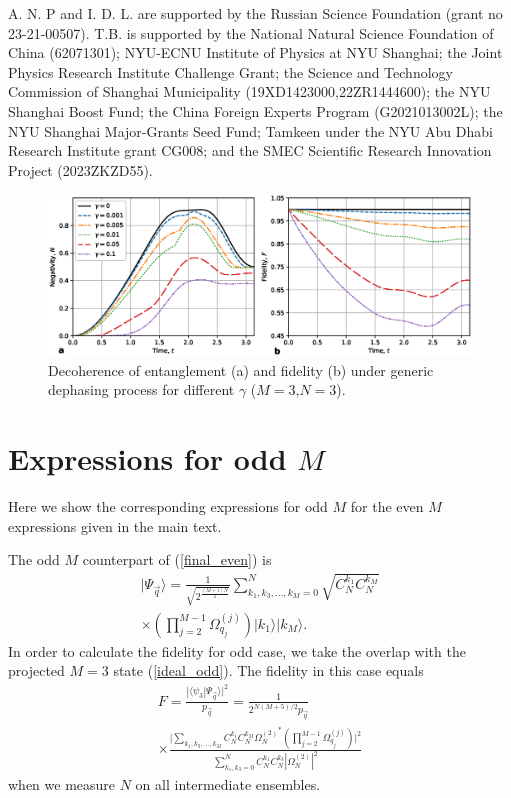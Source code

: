 \documentclass{WileyMSP-template}
\begin{document}
{A. N. P and I. D. L.  are supported by the Russian Science Foundation (grant no 23-21-00507). T.B. is supported by the National Natural Science Foundation of China (62071301); NYU-ECNU Institute of Physics at NYU Shanghai;  the Joint Physics Research Institute Challenge Grant; the Science and Technology Commission of Shanghai Municipality (19XD1423000,22ZR1444600); the NYU Shanghai Boost Fund; the China Foreign Experts Program (G2021013002L); the NYU Shanghai Major-Grants Seed Fund; Tamkeen under the NYU Abu Dhabi Research Institute grant CG008; and the SMEC Scientific Research Innovation Project (2023ZKZD55).



\begin{figure}[t]
    \centering
    \includegraphics[width=1.85\columnwidth]{negativity-fidelity-decoherence-low-m3-n3.eps}
    \caption{Decoherence of entanglement (a) and fidelity (b) under generic dephasing process for different $\gamma$ ($M=3$,$N=3$).
    }
    \label{decoherence}
\end{figure}



\appendix

\section{Expressions for odd $ M $}
\label{sec:oddMexpressions}

Here we show the corresponding expressions for odd $ M $ for the even $ M $ expressions given in the main text.

The odd $ M $ counterpart of (\ref{final_even}) is
%
\begin{multline}
\label{final_odd}
| \Psi_{\vec{q}} \rangle=\frac{1}{\sqrt{2^{\frac{(M+1)N}{2}}}}\sum_{k_1,k_3,\ldots,k_M=0}^{N} \sqrt{ C^{k_1}_{N}  C^{k_M}_{N} }
 \\ \times \left( \prod_{j=2}^{M-1} \Omega_{q_j}^{(j)} \right) |k_1\rangle|k_M\rangle .
\end{multline}
%
In order to calculate the fidelity for odd case, we take the overlap with the projected $ M = 3 $ state (\ref{ideal_odd}). The fidelity in this case equals
%
\begin{multline}
\label{fidelity_odd}
F = \frac{| \langle  \psi_3 | \Psi_{\vec{q}} \rangle |^2}{p_{\vec{q}} }   =\frac{1}{2^{N(M+5)/2} p_{\vec{q}} }\\
\times \frac{\Big|\sum_{k_1, k_3, \dots, k_M }
 C_N^{k_1}C_N^{k_M} {\Omega_{N}^{(2)}}^* \left( \prod_{j=2}^{M-1} \Omega_{q_j}^{(j)} \right)   \Big|^2 }{ \sum_{k_1,k_3=0}^{N}  C^{k_1}_{N}  C^{k_3}_{N} | \Omega_{N}^{(2)} |^2 }
\end{multline}
%
when we measure $N$ on all  intermediate ensembles.

}
\end{document}
